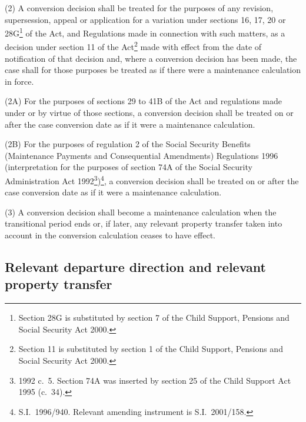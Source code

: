 \documentclass[12pt,a4paper]{article}
\begin{document}
(2) A conversion decision shall be treated for the purposes of any revision, supersession, appeal or application for a variation under sections 16, 17, 20 or 28G\footnote{\frenchspacing Section 28G is substituted by section 7 of the Child Support, Pensions and Social Security Act 2000.} of the Act, and Regulations made in connection with such matters, as a decision under section 11 of the Act\footnote{\frenchspacing Section 11 is substituted by section 1 of the Child Support, Pensions and Social Security Act 2000.} made with effect from the date of notification of that decision and, where a conversion decision has been made, the case shall for those purposes be treated as if there were a maintenance calculation in force.

(2A) For the purposes of sections 29 to 41B of the Act and regulations made under or by virtue of those sections, a conversion decision shall be treated on or after the case conversion date as if it were a maintenance calculation.

(2B) For the purposes of regulation 2 of the Social Security Benefits (Maintenance Payments and Consequential Amendments) Regulations 1996 (interpretation for the purposes of section 74A of the Social Security Administration Act 1992\footnote{1992 c.\ 5. Section 74A was inserted by section 25 of the Child Support Act 1995 (c.\ 34).})\footnote{S.I.\ 1996/940. Relevant amending instrument is S.I.\ 2001/158.}, a conversion decision shall be treated on or after the case conversion date as if it were a maintenance calculation.

(3) A 
conversion decision  %
shall become a maintenance calculation when the transitional period ends or, if later, any relevant property transfer taken into account in 
the conversion calculation  %
ceases to have effect.


\subsection[17. Relevant departure 
direction  %
and relevant property transfer]{Relevant departure 
direction  %
and relevant property transfer}
\end{document}
